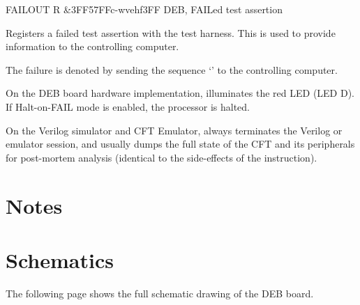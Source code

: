 \begin{extcmd}{FAIL}{OUT R \&3FF}{57FF}{c-wvehf}{3FF}%
       {DEB, FAILed test assertion}%
       {%
         Registers a failed test assertion with the test harness. This
         is used to provide information to the controlling computer.

         The failure is denoted by sending the sequence ‘\cftout{[fail]}’ to the
         controlling computer.

         On the \gls{DEB} board hardware implementation,  illuminates
         the red LED (LED D). If Halt-on-FAIL mode is enabled, the processor is halted.

         On the Verilog simulator and CFT Emulator,  always
         terminates the Verilog or emulator session, and usually dumps the full
         state of the CFT and its peripherals for post-mortem analysis
         (identical to the side-effects of the  instruction).
 }
\end{extcmd}


\section{Notes}


\section{Schematics}

The following page shows the full schematic drawing of the \gls{DEB} board.

